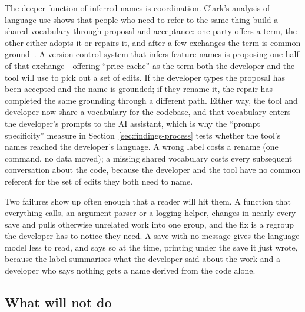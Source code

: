 The deeper function of inferred names is coordination. Clark's analysis of language
use shows that people who need to refer to the same thing build a shared
vocabulary through proposal and acceptance: one party offers a term, the other
either adopts it or repairs it, and after a few exchanges the term is common
ground~\cite{clark1996}. A version control system that infers feature names is
proposing one half of that exchange---offering ``price cache'' as the term both the
developer and the tool will use to pick out a set of edits. If the developer types
 the proposal has been accepted and the name is
grounded; if they rename it, the repair has completed the same grounding through a
different path. Either way, the tool and developer now share a vocabulary for the
codebase, and that vocabulary enters the developer's prompts to the AI assistant,
which is why the ``prompt specificity'' measure in Section~\ref{sec:findings-process}
tests whether the tool's names reached the developer's language. A wrong label costs
a rename (one command, no data moved); a missing shared vocabulary costs every
subsequent conversation about the code, because the developer and the tool have no
common referent for the set of edits they both need to name.

Two failures show up often enough that a reader will hit them. A function that
everything calls, an argument parser or a logging helper, changes in nearly every
save and pulls otherwise unrelated work into one group, and the fix is a regroup the
developer has to notice they need. A save with no message gives the language model
less to read, and \sgt{} says so at the time, printing 
under the save it just wrote, because the label summarises what the developer said
about the work and a developer who says nothing gets a name derived from the code
alone.

\subsection{What \sgt{} will not do}

